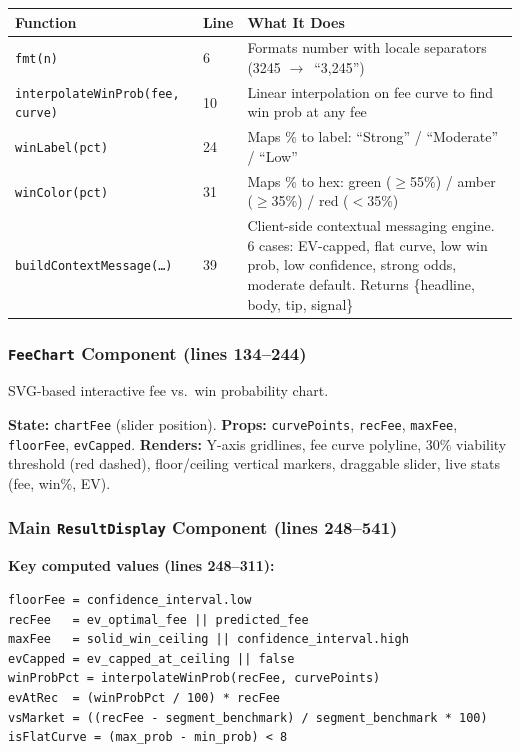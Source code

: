 \documentclass[11pt,a4paper]{article}
\newcommand{\func}[1]{\texttt{\color{gssgreen!80!black}#1}}
\newcommand{\cls}[1]{\texttt{\color{uipurple}#1}}
\newcommand{\arrow}{$\rightarrow$}
\begin{document}
\begin{longtable}{l l p{7cm}}
\toprule
\textbf{Function} & \textbf{Line} & \textbf{What It Does} \\
\midrule
\endhead
\func{fmt(n)} & 6 & Formats number with locale separators (3245 \arrow\ ``3,245'') \\
\func{interpolateWinProb(fee, curve)} & 10 & Linear interpolation on fee curve to find win prob at any fee \\
\func{winLabel(pct)} & 24 & Maps \% to label: ``Strong'' / ``Moderate'' / ``Low'' \\
\func{winColor(pct)} & 31 & Maps \% to hex: green ($\geq$55\%) / amber ($\geq$35\%) / red ($<$35\%) \\
\func{buildContextMessage(\ldots)} & 39 & Client-side contextual messaging engine. 6 cases: EV-capped, flat curve, low win prob, low confidence, strong odds, moderate default. Returns \{headline, body, tip, signal\} \\
\bottomrule
\end{longtable}

\subsubsection{\cls{FeeChart} Component (lines 134--244)}

SVG-based interactive fee vs.\ win probability chart.

\textbf{State:} \texttt{chartFee} (slider position).
\textbf{Props:} \texttt{curvePoints}, \texttt{recFee}, \texttt{maxFee}, \texttt{floorFee}, \texttt{evCapped}.
\textbf{Renders:} Y-axis gridlines, fee curve polyline, 30\% viability threshold (red
dashed), floor/ceiling vertical markers, draggable slider, live stats (fee, win\%,
EV).

\subsubsection{Main \cls{ResultDisplay} Component (lines 248--541)}

\textbf{Key computed values (lines 248--311):}
\begin{lstlisting}
floorFee = confidence_interval.low
recFee   = ev_optimal_fee || predicted_fee
maxFee   = solid_win_ceiling || confidence_interval.high
evCapped = ev_capped_at_ceiling || false
winProbPct = interpolateWinProb(recFee, curvePoints)
evAtRec  = (winProbPct / 100) * recFee
vsMarket = ((recFee - segment_benchmark) / segment_benchmark * 100)
isFlatCurve = (max_prob - min_prob) < 8
\end{lstlisting}
\end{document}

